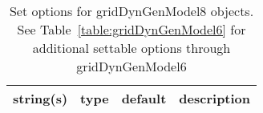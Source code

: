 \begin{table}[ht]
\centering
\begin{tabular}{p{5cm} c c p{7cm}}
\hline
string(s) & type & default & description \\
\hline
\hline
\end{tabular}
\caption{Set options for gridDynGenModel8 objects. See Table~\ref{table:gridDynGenModel6} for additional settable options through gridDynGenModel6}
\label{table:gridDynGenModel8}
\end{table}

